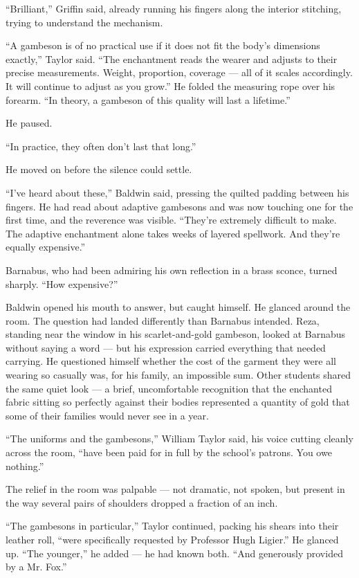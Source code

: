\enquote{Brilliant,} Griffin said, already running his fingers along the interior stitching, trying to understand the mechanism.
 
\enquote{A gambeson is of no practical use if it does not fit the body's dimensions exactly,} Taylor said. \enquote{The enchantment reads the wearer and adjusts to their precise measurements. Weight, proportion, coverage --- all of it scales accordingly. It will continue to adjust as you grow.} He folded the measuring rope over his forearm. \enquote{In theory, a gambeson of this quality will last a lifetime.}
 
He paused.
 
\enquote{In practice, they often don't last that long.}
 
He moved on before the silence could settle.
 
\enquote{I've heard about these,} Baldwin said, pressing the quilted padding between his fingers. He had read about adaptive gambesons and was now touching one for the first time, and the reverence was visible. \enquote{They're extremely difficult to make. The adaptive enchantment alone takes weeks of layered spellwork. And they're equally expensive.}
 
Barnabus, who had been admiring his own reflection in a brass sconce, turned sharply. \enquote{How expensive?}
 
Baldwin opened his mouth to answer, but caught himself. He glanced around the room. The question had landed differently than Barnabus intended. Reza, standing near the window in his scarlet-and-gold gambeson, looked at Barnabus without saying a word --- but his expression carried everything that needed carrying. He questioned himself whether the cost of the garment they were all wearing so casually was, for his family, an impossible sum. Other students shared the same quiet look --- a brief, uncomfortable recognition that the enchanted fabric sitting so perfectly against their bodies represented a quantity of gold that some of their families would never see in a year.
 
\enquote{The uniforms and the gambesons,} William Taylor said, his voice cutting cleanly across the room, \enquote{have been paid for in full by the school's patrons. You owe nothing.}
 
The relief in the room was palpable --- not dramatic, not spoken, but present in the way several pairs of shoulders dropped a fraction of an inch.
 
\enquote{The gambesons in particular,} Taylor continued, packing his shears into their leather roll, \enquote{were specifically requested by Professor Hugh Ligier.} He glanced up. \enquote{The younger,} he added --- he had known both. \enquote{And generously provided by a Mr. Fox.}
 

